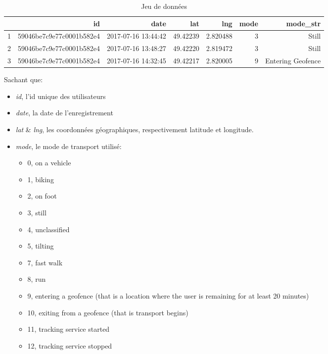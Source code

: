 \documentclass{article}
\begin{document}
\begin{table}[ht]
\centering
\captionsetup{justification=centering}
    \caption{Jeu de données}
\begin{tabular}{rrrrrrr}
  \hline
 & id & date & lat & lng & mode & mode\_str\\ 
  \hline
1 & 59046be7c9e77c0001b582e4 & 2017-07-16 13:44:42 & 49.42239 & 2.820488 & 3 & Still  \\
2 & 59046be7c9e77c0001b582e4 & 2017-07-16 13:48:27 & 49.42220 & 2.819472 & 3 & Still \\
3 & 59046be7c9e77c0001b582e4 & 2017-07-16 14:32:45 & 49.42217 & 2.820005  &  9  & Entering Geofence \\
   
\end{tabular}
\end{table}

Sachant que:
\begin{itemize}
    \item \textit{id}, l'id unique des utilisateurs
    \item \textit{date}, la date de l'enregistrement
    \item \textit{lat} & \textit{lng}, les coordonnées géographiques, respectivement latitude et longitude.
    \item \textit{mode}, le mode de transport utilisé:
        \begin{itemize}
            \item 0, on a vehicle
            \item 1, biking
            \item 2, on foot
            \item 3, still
            \item 4, unclassified
            \item 5, tilting
            \item 7, fast walk
            \item 8, run
            \item 9, entering a geofence (that is a location where the user is remaining for at least 20 minutes)
            \item 10, exiting from a geofence (that is transport begins)
            \item 11, tracking service started
            \item 12, tracking service stopped\\
        \end{itemize}
\end{itemize}
\end{document}
